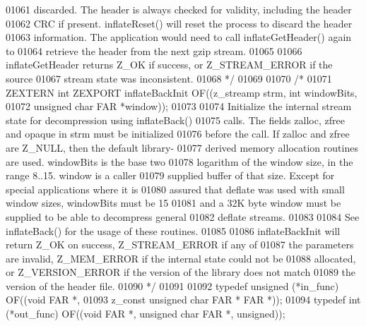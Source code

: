 \begin{DoxyCode}
01061 \textcolor{comment}{   discarded.  The header is always checked for validity, including the header}
01062 \textcolor{comment}{   CRC if present.  inflateReset() will reset the process to discard the header}
01063 \textcolor{comment}{   information.  The application would need to call inflateGetHeader() again to}
01064 \textcolor{comment}{   retrieve the header from the next gzip stream.}
01065 \textcolor{comment}{}
01066 \textcolor{comment}{     inflateGetHeader returns Z\_OK if success, or Z\_STREAM\_ERROR if the source}
01067 \textcolor{comment}{   stream state was inconsistent.}
01068 \textcolor{comment}{*/}
01069 
01070 \textcolor{comment}{/*}
01071 \textcolor{comment}{ZEXTERN int ZEXPORT inflateBackInit OF((z\_streamp strm, int windowBits,}
01072 \textcolor{comment}{                                        unsigned char FAR *window));}
01073 \textcolor{comment}{}
01074 \textcolor{comment}{     Initialize the internal stream state for decompression using inflateBack()}
01075 \textcolor{comment}{   calls.  The fields zalloc, zfree and opaque in strm must be initialized}
01076 \textcolor{comment}{   before the call.  If zalloc and zfree are Z\_NULL, then the default library-}
01077 \textcolor{comment}{   derived memory allocation routines are used.  windowBits is the base two}
01078 \textcolor{comment}{   logarithm of the window size, in the range 8..15.  window is a caller}
01079 \textcolor{comment}{   supplied buffer of that size.  Except for special applications where it is}
01080 \textcolor{comment}{   assured that deflate was used with small window sizes, windowBits must be 15}
01081 \textcolor{comment}{   and a 32K byte window must be supplied to be able to decompress general}
01082 \textcolor{comment}{   deflate streams.}
01083 \textcolor{comment}{}
01084 \textcolor{comment}{     See inflateBack() for the usage of these routines.}
01085 \textcolor{comment}{}
01086 \textcolor{comment}{     inflateBackInit will return Z\_OK on success, Z\_STREAM\_ERROR if any of}
01087 \textcolor{comment}{   the parameters are invalid, Z\_MEM\_ERROR if the internal state could not be}
01088 \textcolor{comment}{   allocated, or Z\_VERSION\_ERROR if the version of the library does not match}
01089 \textcolor{comment}{   the version of the header file.}
01090 \textcolor{comment}{*/}
01091 
01092 \textcolor{keyword}{typedef} unsigned (*in\_func) OF((\textcolor{keywordtype}{void} FAR *,
01093                                 z\_const \textcolor{keywordtype}{unsigned} \textcolor{keywordtype}{char} FAR * FAR *));
01094 \textcolor{keyword}{typedef} int (*out\_func) OF((\textcolor{keywordtype}{void} FAR *, \textcolor{keywordtype}{unsigned} \textcolor{keywordtype}{char} FAR *, \textcolor{keywordtype}{unsigned}));

\end{DoxyCode}
